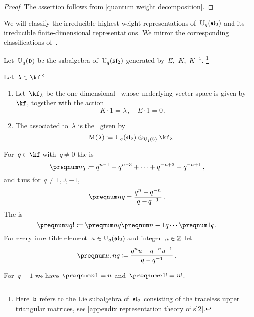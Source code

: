 \documentclass[a4paper, 11pt, oneside]{scrartcl}
\begin{document}
\begin{proof}
  The assertion follows from \cref{quantum weight decomposition}.
\end{proof}

We will classify the irreducible highest-weight representations of~$\operatorname{U}_q(\mathfrak{sl}_2)$ and its irreducible finite-dimensional representations.
We mirror the corresponding classifications of~.

\begin{definition}
  Let~$\operatorname{U}_q(\mathfrak{b})$ be the subalgebra of~$\operatorname{U}_q(\mathfrak{sl}_2)$ generated by~$E$,~$K$,~$K^{-1}$.%
  \footnote{
    Here~$\mathfrak{b}$ refers to the Lie subalgebra of~$\mathfrak{sl}_2$ consisting of the traceless upper triangular matrices, see \cref{appendix representation theory of sl2}.
  }
\end{definition}

\begin{definition}
  Let~$\lambda \in \kf^\times$.
  \begin{enumerate}
    \item
      Let~$\kf_\lambda$ be the one-dimensional~ whose underlying vector space is given by~$\kf$, together with the action
      \[
        K \cdot 1 = \lambda \,,
        \quad
        E \cdot 1 = 0 \,.
      \]
    \item
      The  associated to~$\lambda$ is the~ given by
      \[
        \verma(\lambda)
        \defined
        \Univ_q(\sllie_2) \tensor_{\Univ_q(\blie)} \kf_\lambda \,.
      \]
  \end{enumerate}
\end{definition}

\begin{definition}
  \label{definition of quantum integers}
  For~$q \in \kf$ with~$q \neq 0$ the  is
  \[
    \qnum{n}
    \defined
    q^{n-1} + q^{n-3} + \dotsb + q^{-n+3} + q^{-n+1} \,,
  \]
  and thus for~$q \neq 1, 0, -1$,
  \[
    \qnum{n}
    =
    \frac{q^n - q^{-n}}{q - q^{-1}} \,.
  \]
  The  is
  \[
    \qnum{n}!
    \defined
    \qnum{n} \qnum{n-1} \dotsm \qnum{1} \,.
  \]
  For every invertible element~$u \in \operatorname{U}_q(\mathfrak{sl}_2)$ and integer~$n \in \mathbb{Z}$ let
  \[
    \qnum{u, n}
    \defined
    \frac{ q^n u - q^{-n} u^{-1} }{ q - q^{-1} } \,.
  \]
\end{definition}

\begin{remark}
  For~$q = 1$ we have~$\qnum{n}[1] = n$ and~$\qnum{n}[1]! = n!$.
\end{remark}
\end{document}
